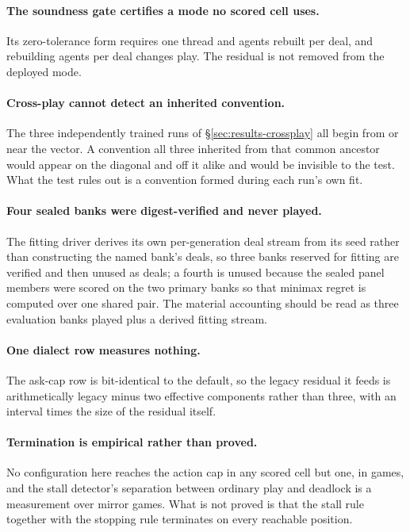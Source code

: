\paragraph{The soundness gate certifies a mode no scored cell uses.} Its zero-tolerance form requires
one thread and agents rebuilt per deal, and rebuilding agents per deal changes play. The residual is
not removed from the deployed mode.

\paragraph{Cross-play cannot detect an inherited convention.} The three independently trained runs of
\S\ref{sec:results-crossplay} all begin from or near the \vsix{} vector. A convention all three
inherited from that common ancestor would appear on the diagonal and off it alike and would be
invisible to the test. What the test rules out is a convention formed during each run's own fit.

\paragraph{Four sealed banks were digest-verified and never played.} The fitting driver derives its
own per-generation deal stream from its seed rather than constructing the named bank's deals, so three
banks reserved for fitting are verified and then unused as deals; a fourth is unused because the
sealed panel members were scored on the two primary banks so that minimax regret is computed over one
shared pair. The material accounting should be read as three evaluation banks played plus a derived
fitting stream.

\paragraph{One dialect row measures nothing.} The ask-cap row is bit-identical to the default, so the
legacy residual it feeds is arithmetically legacy minus two effective components rather than three,
with an interval \vsevenLegacyResidualRatio{} times the size of the residual itself.

\paragraph{Termination is empirical rather than proved.} No configuration here reaches the action cap
in any scored cell but one, in \vsevenLimitCellGames{} games, and the stall detector's separation
between ordinary play and deadlock is a measurement over \vsevenStallMirrorGames{} mirror games. What
is not proved is that the stall rule together with the stopping rule terminates on every reachable
position.


